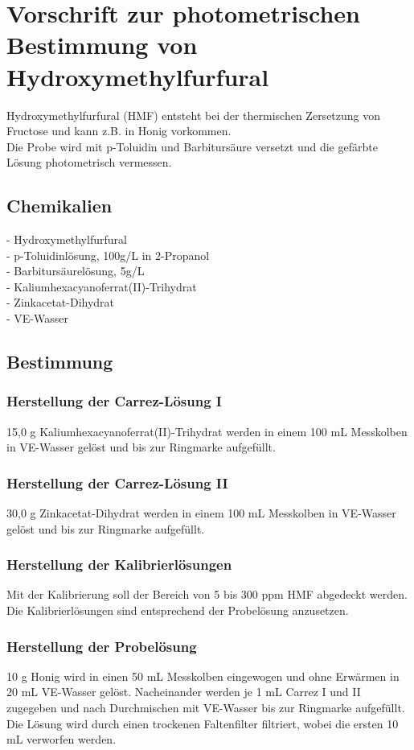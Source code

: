 \chapter{Vorschrift zur photometrischen Bestimmung von Hydroxymethylfurfural}

Hydroxymethylfurfural (HMF) entsteht bei der thermischen Zersetzung von Fructose und kann z.B. in Honig vorkommen.\\
Die Probe wird mit p-Toluidin und Barbitursäure versetzt und die gefärbte Lösung photometrisch vermessen.

\section{Chemikalien}
- Hydroxymethylfurfural\\
- p-Toluidinlösung, 100g/L in 2-Propanol\\
- Barbitursäurelösung, 5g/L\\
- Kaliumhexacyanoferrat(II)-Trihydrat\\
- Zinkacetat-Dihydrat\\
- VE-Wasser

\section{Bestimmung}
\subsection{Herstellung der Carrez-Lösung I}
15,0 g Kaliumhexacyanoferrat(II)-Trihydrat werden in einem 100 mL Messkolben in VE-Wasser gelöst und bis zur Ringmarke aufgefüllt.
\subsection{Herstellung der Carrez-Lösung II}
30,0 g Zinkacetat-Dihydrat werden in einem 100 mL Messkolben in VE-Wasser gelöst und bis zur Ringmarke aufgefüllt.
\subsection{Herstellung der Kalibrierlösungen}
Mit der Kalibrierung soll der Bereich von 5 bis 300 ppm HMF abgedeckt werden. Die Kalibrierlösungen sind entsprechend der Probelösung anzusetzen.
\subsection{Herstellung der Probelösung}
10 g Honig wird in einen 50 mL Messkolben eingewogen und ohne Erwärmen in 20 mL VE-Wasser gelöst. Nacheinander werden je 1 mL Carrez I und II zugegeben und nach Durchmischen mit VE-Wasser bis zur Ringmarke aufgefüllt. Die Lösung wird durch einen trockenen Faltenfilter filtriert, wobei die ersten 10 mL verworfen werden.
